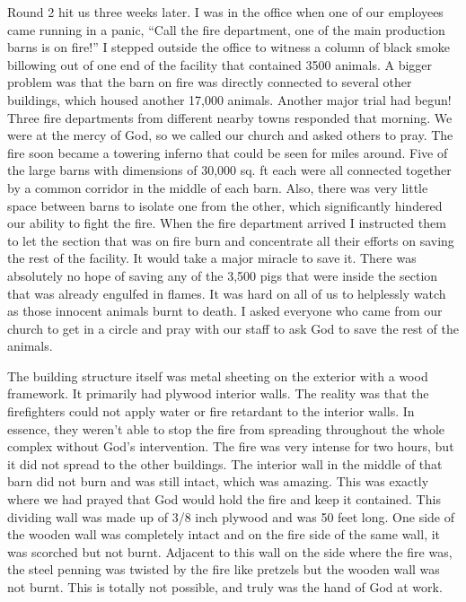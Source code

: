 \documentclass[twoside, 12pt]{book}
\begin{document}
Round 2 hit us three weeks later. I was in the office when one of our employees came running in a panic, “Call the fire department, one of the main production barns is on fire!” I stepped outside the office to witness a column of black smoke billowing out of one end of the facility that contained 3500 animals. A bigger problem was that the barn on fire was directly connected to several other buildings, which housed another 17,000 animals. Another major trial had begun! Three fire departments from different nearby towns responded that morning. We were at the mercy of God, so we called our church and asked others to pray. The fire soon became a towering inferno that could be seen for miles around. Five of the large barns with dimensions of 30,000 sq. ft each were all connected together by a common corridor in the middle of each barn. Also, there was very little space between barns to isolate one from the other, which significantly hindered our ability to fight the fire. When the fire department arrived I instructed them to let the section that was on fire burn and concentrate all their efforts on saving the rest of the facility. It would take a major miracle to save it. There was absolutely no hope of saving any of the 3,500 pigs that were inside the section that was already engulfed in flames. It was hard on all of us to helplessly watch as those innocent animals burnt to death. I asked everyone who came from our church to get in a circle and pray with our staff to ask God to save the rest of the animals.

The building structure itself was metal sheeting on the exterior with a wood framework. It primarily had plywood interior walls. The reality was that the firefighters could not apply water or fire retardant to the interior walls. In essence, they weren’t able to stop the fire from spreading throughout the whole complex without God's intervention. The fire was very intense for two hours, but it did not spread to the other buildings. The interior wall in the middle of that barn did not burn and was still intact, which was amazing. This was exactly where we had prayed that God would hold the fire and keep it contained. This dividing wall was made up of 3/8 inch plywood and was 50 feet long. One side of the wooden wall was completely intact and on the fire side of the same wall, it was scorched but not burnt. Adjacent to this wall on the side where the fire was, the steel penning was twisted by the fire like pretzels but the wooden wall was not burnt. This is totally not possible, and truly was the hand of God at work.
\end{document}
